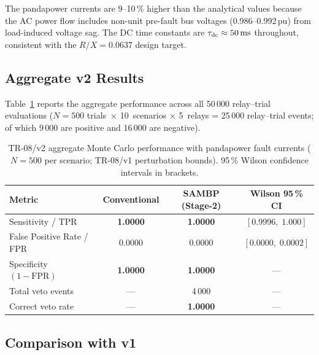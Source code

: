\documentclass[12pt,a4paper]{article}
\begin{document}
\noindent
The pandapower currents are 9–10\,\% higher than the analytical values
because the AC power flow includes non-unit pre-fault bus voltages (0.986–0.992\,pu)
from load-induced voltage sag.  The DC time constants are
$\tau_{\rm dc} \approx 50\,\text{ms}$ throughout, consistent with the
$R/X = 0.0637$ design target.

\subsection{Aggregate v2 Results}

Table~\ref{tab:v2_aggregate} reports the aggregate performance across
all 50\,000 relay--trial evaluations ($N=500$ trials~$\times$ 10~scenarios
$\times$ 5~relays = 25\,000 relay--trial events; of which 9\,000 are
positive and 16\,000 are negative).

\begin{table}[ht]
\centering
\caption{TR-08/v2 aggregate Monte Carlo performance with pandapower
  fault currents ($N=500$ per scenario; TR-08/v1 perturbation bounds).
  95\,\% Wilson confidence intervals in brackets.}
\label{tab:v2_aggregate}
\begin{tabular}{lccc}
\toprule
Metric & Conventional & SAMBP (Stage-2) & Wilson 95\,\% CI \\
\midrule
Sensitivity / TPR
  & \textbf{1.0000} & \textbf{1.0000}
  & $[0.9996,\;1.000]$ \\
False Positive Rate / FPR
  & \textcolor{okgreen}{0.0000} & \textcolor{okgreen}{0.0000}
  & $[0.0000,\;0.0002]$ \\
Specificity $(1-\text{FPR})$
  & \textbf{1.0000} & \textbf{1.0000} & --- \\
\midrule
Total veto events          & --- & 4\,000 & --- \\
Correct veto rate          & --- & \textbf{1.0000} & --- \\
\bottomrule
\end{tabular}
\end{table}

\subsection{Comparison with v1}
\end{document}
